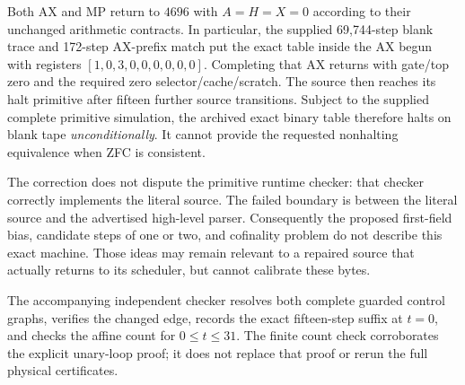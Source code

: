Both AX and MP return to $4696$ with $A=H=X=0$ according to their
unchanged arithmetic contracts. In particular, the supplied 69,744-step
blank trace and 172-step AX-prefix match put the exact table inside
the AX begun with registers $[1,0,3,0,0,0,0,0,0]$. Completing that AX
returns with gate/top zero and the required zero selector/cache/scratch.
The source then reaches its halt primitive after fifteen further source
transitions. Subject to the supplied complete primitive simulation, the
archived exact binary table therefore halts on blank tape
\emph{unconditionally}. It cannot provide the requested nonhalting
equivalence when ZFC is consistent.

The correction does not dispute the primitive runtime checker: that
checker correctly implements the literal source. The failed boundary
is between the literal source and the advertised high-level parser.
Consequently the proposed first-field bias, candidate steps of one or
two, and cofinality problem do not describe this exact machine. Those
ideas may remain relevant to a repaired source that actually returns
to its scheduler, but cannot calibrate these bytes.

The accompanying independent checker resolves both complete guarded
control graphs, verifies the changed edge, records the exact fifteen-step
suffix at $t=0$, and checks the affine count for $0\le t\le31$.
The finite count check corroborates the explicit unary-loop proof; it
does not replace that proof or rerun the full physical certificates.
